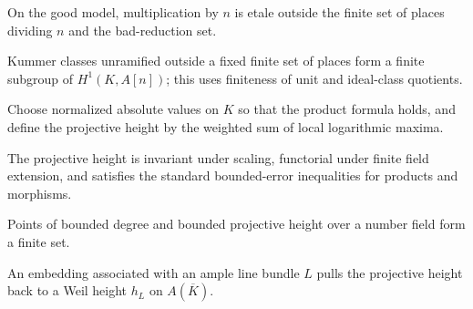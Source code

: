 \begin{corollary}
\label{mumford-app2-etale-division-corollary}
On the good model, multiplication by $n$ is etale outside the finite set of
places dividing $n$ and the bad-reduction set.
\notready
\end{corollary}

\begin{lemma}
\label{mumford-app2-arithmetic-unramified-classes}
Kummer classes unramified outside a fixed finite set of places form a finite
subgroup of $H^1(K,A[n])$; this uses finiteness of unit and ideal-class
quotients.
\notready
\end{lemma}

\begin{definition}
\label{mumford-app2-normalized-absolute-values}
Choose normalized absolute values on $K$ so that the product formula holds, and
define the projective height by the weighted sum of local logarithmic maxima.
\notready
\end{definition}

\begin{proposition}
\label{mumford-app2-projective-height-properties}
The projective height is invariant under scaling, functorial under finite field
extension, and satisfies the standard bounded-error inequalities for products
and morphisms.
\notready
\end{proposition}

\begin{proposition}
\label{mumford-app2-northcott-proposition}
Points of bounded degree and bounded projective height over a number field form
a finite set.
\notready
\end{proposition}

\begin{definition}
\label{mumford-app2-line-bundle-height}
An embedding associated with an ample line bundle $L$ pulls the projective
height back to a Weil height $h_L$ on $A(\overline K)$.
\notready
\end{definition}

